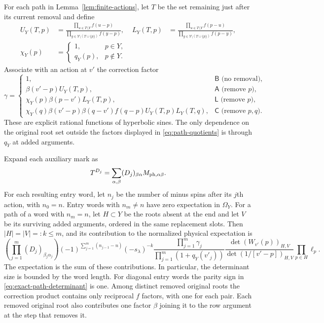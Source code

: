 For each path in Lemma~\ref{lem:finite-actions}, let $T$ be the set
remaining just after its current removal and define
\begin{align}
 U_Y(T,p)&=
  \frac{\prod_{u\in T\setminus Y}f(u-p)}
       {\prod_{y\in Y\setminus(T\cup\{p\})}f(y-p)},&
 L_Y(T,p)&=
  \frac{\prod_{u\in T\setminus Y}f(p-u)}
       {\prod_{y\in Y\setminus(T\cup\{p\})}f(p-y)},
 \label{eq:path-quotients}\\
 \chi_Y(p)&=
  \begin{cases}1,&p\in Y,\\q_Y(p),&p\notin Y.\end{cases}
 \label{eq:path-lower-factor}
\end{align}
Associate with an action at $v'$ the correction factor
\begin{equation}\label{eq:path-correction}
 \gamma=
 \begin{cases}
  1,&\mathsf B\text{ (no removal)},\\
  \beta(v'-p)U_Y(T,p),&\mathsf A\text{ (remove }p),\\
  \chi_Y(p)\beta(p-v')L_Y(T,p),&\mathsf L\text{ (remove }p),\\
  \chi_Y(q)\beta(v'-p)\beta(q-v')f(q-p)
        U_Y(T,p)L_Y(T,q),&\mathsf C\text{ (remove }p,q).
 \end{cases}
\end{equation}
These are explicit rational functions of hyperbolic sines.  The only
dependence on the original root set outside the factors displayed in
\eqref{eq:path-quotients} is through $q_Y$ at added arguments.

\begin{corollary}\label{cor:finite-word-expansion}
Expand each auxiliary mark as
\[
 T^{D_j}=\sum_{\alpha,\beta}(D_j)_{\beta\alpha}
 M_{{\rm ph},\alpha\beta}.
\]
For each resulting entry word, let $n_j$
be the number of minus spins after its $j$th action, with $n_0=n$.
Entry words with $n_m\ne n$ have zero expectation in $\Omega_Y$.
For a path of a word with $n_m=n$, let $H\subset Y$ be the roots
absent at the end and let $V$ be its surviving added arguments, ordered
in the same replacement slots.  Then $|H|=|V|=:k\le m$, and its
contribution to the normalized physical expectation is
\begin{equation}\label{eq:exact-path-determinant}
 \left(\prod_{j=1}^m(D_j)_{\beta_j\alpha_j}\right)
 (-1)^{\sum_{j=1}^m(n_{j-1}-n)}
 (-s_\lambda)^{-k}
 \frac{\prod_{j=1}^m\gamma_j}
      {\prod_{j=1}^m(1+q_Y(v'_j))}
 \frac{\det(W_{v'}(p))_{H,V}}
      {\det(1/[v'-p])_{H,V}}
 \prod_{p\in H}\ell_p.
\end{equation}
The expectation is the sum of these contributions.  In particular,
the determinant size is bounded by the word length.  For diagonal
entry words the parity sign in \eqref{eq:exact-path-determinant} is
one.  Among distinct removed original roots the correction product
contains only reciprocal $f$ factors, with one for each pair.  Each
removed original root also contributes one factor $\beta$ joining it
to the row argument at the step that removes it.
\end{corollary}

